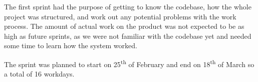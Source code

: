 The first sprint had the purpose of getting to know the codebase, how the whole project was structured, and work out any potential problems with the work process. 
The amount of actual work on the product was not expected to be as high as future sprints, as we were not familiar with the codebase yet and needed some time to learn how the system worked. 

The sprint was planned to start on 25\textsuperscript{th} of February and end on 18\textsuperscript{th} of March so a total of 16 workdays.
